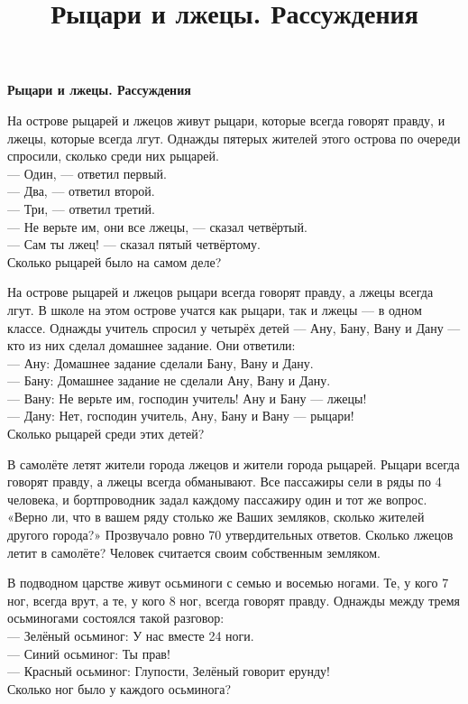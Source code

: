 \centerline{\bf \Huge Рыцари и лжецы. Рассуждения}
\title{ Рыцари и лжецы. Рассуждения}

 На острове рыцарей и лжецов живут рыцари, которые всегда
говорят правду, и лжецы, которые всегда лгут. Однажды пятерых жителей этого острова по очереди спросили, сколько среди них рыцарей.\\
— Один, — ответил первый.\\
— Два, — ответил второй.\\
— Три, — ответил третий.\\
— Не верьте им, они все лжецы, — сказал четвёртый.\\
— Сам ты лжец! — сказал пятый четвёртому.\\
Сколько рыцарей было на самом деле?

 На острове рыцарей и лжецов рыцари всегда говорят правду, а лжецы всегда лгут. В школе на этом острове учатся как рыцари, так и лжецы —
в одном классе. Однажды учитель спросил у четырёх детей — Ану, Бану, Вану и Дану — кто из них сделал домашнее задание. Они ответили:\\
— Ану: Домашнее задание сделали Бану, Вану и Дану.\\
— Бану: Домашнее задание не сделали Ану, Вану и Дану.\\
— Вану: Не верьте им, господин учитель! Ану и Бану — лжецы!\\
— Дану: Нет, господин учитель, Ану, Бану и Вану — рыцари!\\
Сколько рыцарей среди этих детей?

 В самолёте летят жители города лжецов и жители города рыцарей. Рыцари всегда говорят правду, а лжецы всегда обманывают. Все пассажиры сели в ряды по 4 человека, и бортпроводник задал каждому пассажиру один и тот же вопрос. «Верно ли, что в вашем ряду столько же Ваших земляков, сколько жителей другого города?» Прозвучало ровно 70 утвердительных ответов. Сколько лжецов летит в самолёте? Человек считается своим собственным земляком.

 В подводном царстве живут осьминоги с семью и восемью ногами.
Те, у кого 7 ног, всегда врут, а те, у кого 8 ног, всегда говорят правду. Однажды между тремя осьминогами состоялся такой разговор:\\
— Зелёный осьминог: У нас вместе 24 ноги.\\
— Синий осьминог: Ты прав!\\
— Красный осьминог: Глупости, Зелёный говорит ерунду!\\
Сколько ног было у каждого осьминога?\\

